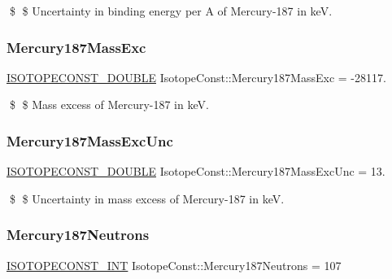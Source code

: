 \$ \$ Uncertainty in binding energy per A of Mercury-\/187 in keV. \mbox{\label{group___isotope_const-_mercury-_hg187_gad6df6a5d15f9ab12a9f1da59e5770c52}} 
\subsubsection{\texorpdfstring{Mercury187\+Mass\+Exc}{Mercury187MassExc}}
{\footnotesize\ttfamily \mbox{\hyperlink{group___isotope_const-_macros_ga8f45a7272ce02c0b4c65c44636ed719a}{I\+S\+O\+T\+O\+P\+E\+C\+O\+N\+S\+T\+\_\+\+D\+O\+U\+B\+LE}} Isotope\+Const\+::\+Mercury187\+Mass\+Exc = -\/28117.}

\$ \$ Mass excess of Mercury-\/187 in keV. \mbox{\label{group___isotope_const-_mercury-_hg187_gadb429b3b4caa662709a670186c8c8b1a}} 
\subsubsection{\texorpdfstring{Mercury187\+Mass\+Exc\+Unc}{Mercury187MassExcUnc}}
{\footnotesize\ttfamily \mbox{\hyperlink{group___isotope_const-_macros_ga8f45a7272ce02c0b4c65c44636ed719a}{I\+S\+O\+T\+O\+P\+E\+C\+O\+N\+S\+T\+\_\+\+D\+O\+U\+B\+LE}} Isotope\+Const\+::\+Mercury187\+Mass\+Exc\+Unc = 13.}

\$ \$ Uncertainty in mass excess of Mercury-\/187 in keV. \mbox{\label{group___isotope_const-_mercury-_hg187_ga6da25b767476d7b3b2f1f6c7cd711c2e}} 
\subsubsection{\texorpdfstring{Mercury187\+Neutrons}{Mercury187Neutrons}}
{\footnotesize\ttfamily \mbox{\hyperlink{group___isotope_const-_macros_ga5f18360b3e99483a35c32d789e62621c}{I\+S\+O\+T\+O\+P\+E\+C\+O\+N\+S\+T\+\_\+\+I\+NT}} Isotope\+Const\+::\+Mercury187\+Neutrons = 107}

